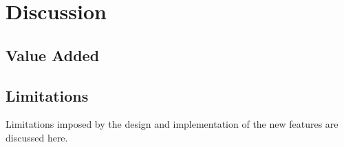 \chapter{Discussion}





\section{Value Added}

\section{Limitations}
Limitations imposed by the design and implementation of the new features are
discussed here.

